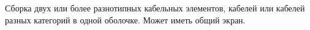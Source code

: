 Сборка двух или более разнотипных кабельных элементов,
кабелей или кабелей разных категорий в одной оболочке. 
Может иметь общий экран.